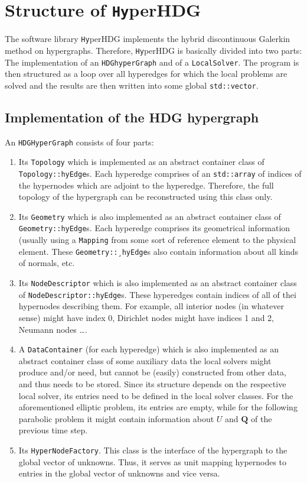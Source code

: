 \documentclass[a4paper, english, 12pt, reqno, draft]{amsart}
\theoremstyle{definition}
\theoremstyle{remark}
\numberwithin{equation}{section}
\newcommand{\hyperHDG}{{\fontfamily{pzc}\selectfont \texttt{Hy}\hspace{-1.5pt}perHDG }}
\renewcommand{\vec}[1]{\ensuremath{\boldsymbol{#1}}}
\newcommand{\code}[1]{\texttt{#1}}
\begin{document}
\section{Structure of \hyperHDG}
% 
The software library \hyperHDG implements the hybrid discontinuous Galerkin method on hypergraphs. Therefore, \hyperHDG is basically divided into two parts: The implementation of an \code{HDGhyperGraph} and of a \code{LocalSolver}. The program is then structured as a loop over all hyperedges for which the local problems are solved and the results are then written into some global \code{std::vector}.
% 
\subsection{Implementation of the HDG hypergraph}
% 
An \code{HDG\-Hyper\-Graph} consists of four parts:
% 
\begin{enumerate}
 \item Its \code{Topology} which is implemented as an abstract container class of \code{Topology::hyEdge}s. Each hyperedge comprises of an \code{std::array} of indices of the hypernodes which are adjoint to the hyperedge. Therefore, the full topology of the hypergraph can be reconstructed using this class only.
 \item Its \code{Geometry} which is also implemented as an abstract container class of \code{Geometry::hyEdge}s. Each hyperedge comprises its geometrical information (usually using a \code{Mapping} from some sort of reference element to the physical element. These \code{Geometry::\-¸hyEdge}s also contain information about all kinds of normals, etc.
 \item Its \code{NodeDescriptor} which is also implemented as an abstract container class of \code{NodeDescriptor::hyEdge}s. These hyperedges contain indices of all of thei hypernodes describing them. For example, all interior nodes (in whatever sense) might have index 0, Dirichlet nodes might have indices 1 and 2, Neumann nodes \ldots.
 \item A \code{DataContainer} (for each hyperedge) which is also implemented as an abstract container class of some auxiliary data the local solvers might produce and/or need, but cannot be (easily) constructed from other data, and thus needs to be stored. Since its structure depends on the respective local solver, its entries need to be defined in the local solver classes. For the aforementioned elliptic problem, its entries are empty, while for the following parabolic problem it might contain information about $U$ and $\vec Q$ of the previous time step.
 \item Its \code{HyperNodeFactory}. This class is the interface of the hypergraph to the global vector of unknowns. Thus, it serves as unit mapping hypernodes to entries in the global vector of unknowns and vice versa.
\end{enumerate}
\end{document}
